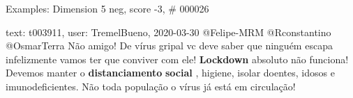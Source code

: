 \begin{frame}{Examples: Dimension 5 neg, score -3, \# 000026}
\footnotesize
\begin{alertblock}{text: t003911, user: TremelBueno, 2020-03-30}
@Felipe-MRM @Rconstantino @OsmarTerra Não amigo! De vírus gripal vc deve saber 
que ninguém escapa infelizmente vamos ter que conviver com ele! 
\textbf{Lockdown} absoluto não funciona! Devemos manter o 
\textbf{distanciamento} \textbf{social} , higiene, isolar doentes, idosos e 
imunodeficientes. Não toda população o vírus já está em circulação! 
\end{alertblock}
\end{frame}
